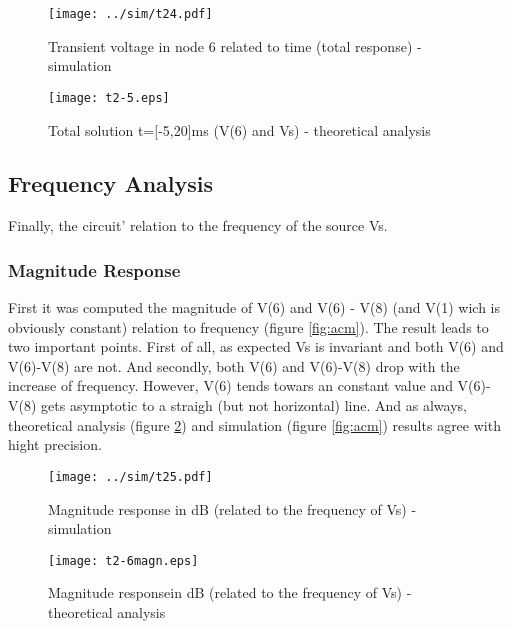 \begin{figure}[h] \centering
  \begin{minipage}{.5\textwidth}
    \texttt{[image: ../sim/t24.pdf]}
    \caption{Transient voltage in node 6 related to time (total response) - simulation}
    \label{fig:trans2}
    \end{minipage}%
  \begin{minipage}{.5\textwidth}
    \vspace{10mm}
  \centering
    \texttt{[image: t2-5.eps]}
    \caption{Total solution t=[-5,20]ms (V(6) and Vs) - theoretical analysis}
    \label{fig:comptot}
      \end{minipage}%
\end{figure}




\subsection{Frequency Analysis}

Finally, the circuit' relation to the frequency of the source Vs.

\subsubsection{Magnitude Response}

First it was computed the magnitude of V(6) and V(6) - V(8) (and V(1) wich is obviously constant) relation to frequency (figure \ref{fig:acm}). The result leads to two important points. First of all, as expected Vs is invariant and both V(6) and V(6)-V(8) are not. And secondly, both V(6) and V(6)-V(8) drop with the increase of frequency. However, V(6) tends towars an constant value and V(6)-V(8) gets asymptotic to a straigh (but not horizontal) line. And as always, theoretical analysis (figure \ref{fig:compmagn}) and simulation (figure \ref{fig:acm}) results agree with hight precision.



\begin{figure}[h] \centering
  \begin{minipage}{.5\textwidth}
    \texttt{[image: ../sim/t25.pdf]}
    \caption{Magnitude response in dB (related to the frequency of Vs) - simulation}
    \label{fig:acm}
    \end{minipage}%
  \begin{minipage}{.5\textwidth}
    \vspace{10mm}
  \centering
    \texttt{[image: t2-6magn.eps]}
    \caption{Magnitude responsein dB (related to the frequency of Vs) - theoretical analysis }
    \label{fig:compmagn}
      \end{minipage}%
\end{figure}

